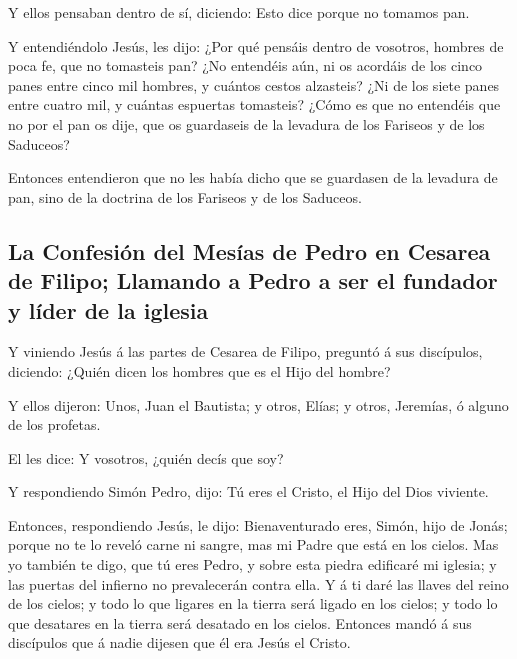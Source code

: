  Y ellos pensaban dentro de sí, diciendo: Esto dice porque
no tomamos pan.

 Y entendiéndolo Jesús, les dijo: ¿Por qué pensáis dentro de
vosotros, hombres de poca fe, que no tomasteis pan?  ¿No
entendéis aún, ni os acordáis de los cinco panes entre cinco mil
hombres, y cuántos cestos alzasteis?  ¿Ni de los siete
panes entre cuatro mil, y cuántas espuertas tomasteis? 
¿Cómo es que no entendéis que no por el pan os dije, que os guardaseis
de la levadura de los Fariseos y de los Saduceos?

 Entonces entendieron que no les había dicho que se
guardasen de la levadura de pan, sino de la doctrina de los Fariseos y
de los Saduceos.

\hypertarget{la-confesiuxf3n-del-mesuxedas-de-pedro-en-cesarea-de-filipo-llamando-a-pedro-a-ser-el-fundador-y-luxedder-de-la-iglesia}{%
\subsection{La Confesión del Mesías de Pedro en Cesarea de Filipo;
Llamando a Pedro a ser el fundador y líder de la
iglesia}\label{la-confesiuxf3n-del-mesuxedas-de-pedro-en-cesarea-de-filipo-llamando-a-pedro-a-ser-el-fundador-y-luxedder-de-la-iglesia}}

 Y viniendo Jesús á las partes de Cesarea de Filipo,
preguntó á sus discípulos, diciendo: ¿Quién dicen los hombres que es el
Hijo del hombre?

 Y ellos dijeron: Unos, Juan el Bautista; y otros, Elías; y
otros, Jeremías, ó alguno de los profetas.

 El les dice: Y vosotros, ¿quién decís que soy?

 Y respondiendo Simón Pedro, dijo: Tú eres el Cristo, el
Hijo del Dios viviente.

 Entonces, respondiendo Jesús, le dijo: Bienaventurado
eres, Simón, hijo de Jonás; porque no te lo reveló carne ni sangre, mas
mi Padre que está en los cielos.  Mas yo también te digo,
que tú eres Pedro, y sobre esta piedra edificaré mi iglesia; y las
puertas del infierno no prevalecerán contra ella.  Y á ti
daré las llaves del reino de los cielos; y todo lo que ligares en la
tierra será ligado en los cielos; y todo lo que desatares en la tierra
será desatado en los cielos.  Entonces mandó á sus
discípulos que á nadie dijesen que él era Jesús el Cristo.


